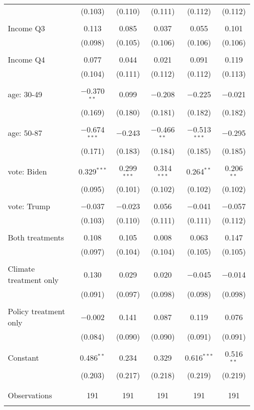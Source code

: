 \begin{tabular}{@{\extracolsep{5pt}}lccccc}
  & (0.103) & (0.110) & (0.111) & (0.112) & (0.112) \\ 
  & & & & & \\ 
 Income Q3 & 0.113 & 0.085 & 0.037 & 0.055 & 0.101 \\ 
  & (0.098) & (0.105) & (0.106) & (0.106) & (0.106) \\ 
  & & & & & \\ 
 Income Q4 & 0.077 & 0.044 & 0.021 & 0.091 & 0.119 \\ 
  & (0.104) & (0.111) & (0.112) & (0.112) & (0.113) \\ 
  & & & & & \\ 
 age: 30-49 & $-$0.370$^{**}$ & 0.099 & $-$0.208 & $-$0.225 & $-$0.021 \\ 
  & (0.169) & (0.180) & (0.181) & (0.182) & (0.182) \\ 
  & & & & & \\ 
 age: 50-87 & $-$0.674$^{***}$ & $-$0.243 & $-$0.466$^{**}$ & $-$0.513$^{***}$ & $-$0.295 \\ 
  & (0.171) & (0.183) & (0.184) & (0.185) & (0.185) \\ 
  & & & & & \\ 
 vote: Biden & 0.329$^{***}$ & 0.299$^{***}$ & 0.314$^{***}$ & 0.264$^{**}$ & 0.206$^{**}$ \\ 
  & (0.095) & (0.101) & (0.102) & (0.102) & (0.102) \\ 
  & & & & & \\ 
 vote: Trump & $-$0.037 & $-$0.023 & 0.056 & $-$0.041 & $-$0.057 \\ 
  & (0.103) & (0.110) & (0.111) & (0.111) & (0.112) \\ 
  & & & & & \\ 
 Both treatments & 0.108 & 0.105 & 0.008 & 0.063 & 0.147 \\ 
  & (0.097) & (0.104) & (0.104) & (0.105) & (0.105) \\ 
  & & & & & \\ 
 Climate treatment only & 0.130 & 0.029 & 0.020 & $-$0.045 & $-$0.014 \\ 
  & (0.091) & (0.097) & (0.098) & (0.098) & (0.098) \\ 
  & & & & & \\ 
 Policy treatment only & $-$0.002 & 0.141 & 0.087 & 0.119 & 0.076 \\ 
  & (0.084) & (0.090) & (0.090) & (0.091) & (0.091) \\ 
  & & & & & \\ 
 Constant & 0.486$^{**}$ & 0.234 & 0.329 & 0.616$^{***}$ & 0.516$^{**}$ \\ 
  & (0.203) & (0.217) & (0.218) & (0.219) & (0.219) \\ 
  & & & & & \\ 
\hline \\[-1.8ex] 

Observations & 191 & 191 & 191 & 191 & 191 \\ 
\hline 
\hline \\[-1.8ex] 
\end{tabular} 